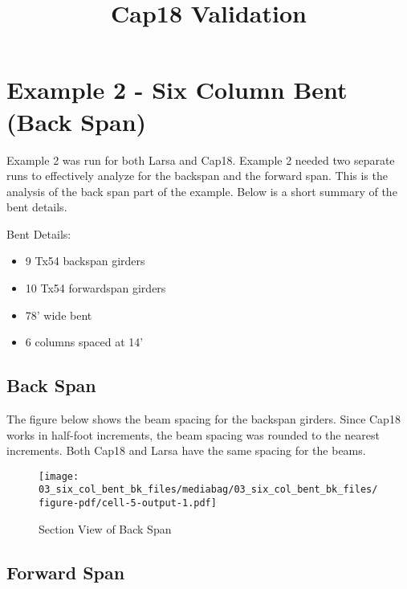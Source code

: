 \documentclass[
  letterpaper,
  DIV=11,
  numbers=noendperiod]{scrartcl}
\title{Cap18 Validation}
\author{}
\date{}
\providecommand{\tightlist}{%
  \setlength{\itemsep}{0pt}\setlength{\parskip}{0pt}}\usepackage{longtable,booktabs,array}
\renewcommand*\contentsname{Table of contents}
\newcommand\contentsname{Table of contents}
\begin{document}
\maketitle

\renewcommand*\contentsname{Table of contents}
{
\hypersetup{linkcolor=}
\setcounter{tocdepth}{3}
\tableofcontents
}
\newpage{}

\section{Example 2 - Six Column Bent (Back
Span)}\label{example-2---six-column-bent-back-span}

Example 2 was run for both Larsa and Cap18. Example 2 needed two
separate runs to effectively analyze for the backspan and the forward
span. This is the analysis of the back span part of the example. Below
is a short summary of the bent details.

Bent Details:

\begin{itemize}
\tightlist
\item
  9 Tx54 backspan girders
\item
  10 Tx54 forwardspan girders
\item
  78' wide bent
\item
  6 columns spaced at 14'
\end{itemize}

\subsection{Back Span}\label{back-span}

The figure below shows the beam spacing for the backspan girders. Since
Cap18 works in half-foot increments, the beam spacing was rounded to the
nearest increments. Both Cap18 and Larsa have the same spacing for the
beams.

\begin{figure}[H]

{\centering \texttt{[image: 03\_six\_col\_bent\_bk\_files/mediabag/03\_six\_col\_bent\_bk\_files/figure-pdf/cell-5-output-1.pdf]}

}

\caption{Section View of Back Span}

\end{figure}%

\subsection{Forward Span}\label{forward-span}
\end{document}
